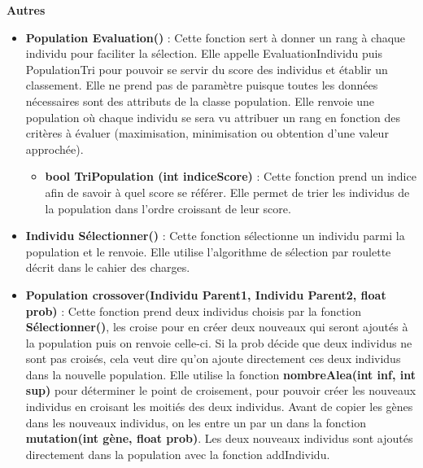 \documentclass[a4paper,11pt]{article}
\begin{document}
			\textbf{Autres}
				\begin{itemize}
							\item \textbf{Population Evaluation()} : Cette fonction sert à donner un rang à chaque individu pour faciliter la sélection. 
								Elle appelle EvaluationIndividu puis PopulationTri pour pouvoir se servir du score des individus et établir un classement. 
								Elle ne prend pas de paramètre puisque toutes les données nécessaires sont des attributs de la classe population. 
								Elle renvoie une population où chaque individu se sera vu attribuer un rang en fonction des critères à évaluer (maximisation, minimisation ou obtention d’une valeur approchée).\vspace{0.2cm}
								\begin{itemize}
								\item \textbf{bool TriPopulation (int indiceScore)} : Cette fonction prend un indice afin de savoir à quel score se référer. 
									Elle permet de trier les individus de la population dans l’ordre croissant de leur score.\vspace{0.2cm}
								\end{itemize}
							
							\item \textbf{Individu Sélectionner()} : Cette fonction sélectionne un individu parmi la population et le renvoie. 
								Elle utilise l’algorithme de sélection par roulette décrit dans le cahier des charges.\vspace{0.2cm}
								
							\item \textbf{Population crossover(Individu Parent1, Individu Parent2, float prob)} : Cette fonction prend deux individus choisis par la fonction \textbf{Sélectionner()}, les croise pour en créer deux nouveaux qui seront ajoutés à la population puis on renvoie celle-ci. 
							Si la prob décide que deux individus ne sont pas croisés, cela veut dire qu’on ajoute directement ces deux individus dans la nouvelle population. 
								Elle utilise la fonction \textbf{nombreAlea(int inf, int sup)} pour déterminer le point de croisement, pour pouvoir créer les nouveaux individus en croisant les moitiés des deux individus.
								Avant de copier les gènes dans les nouveaux individus, on les entre un par un dans la fonction \textbf{mutation(int gène, float prob)}. 
								Les deux nouveaux individus sont ajoutés directement dans la population  avec la fonction addIndividu.\vspace{0.2cm}
							

\end{itemize}
\end{document}
